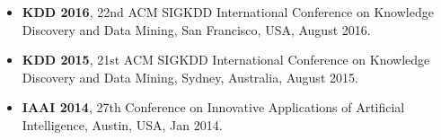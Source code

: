 

\begin{itemize}[nosep]
  \item {\bf KDD 2016}, 22nd ACM SIGKDD International Conference on 
    Knowledge Discovery and Data Mining, San Francisco, USA, August 2016.
  \item {\bf KDD 2015}, 21st ACM SIGKDD International Conference on 
    Knowledge Discovery and Data Mining, Sydney, Australia, August 2015.
  \item {\bf IAAI 2014}, 27th Conference on Innovative Applications of Artificial Intelligence,
    Austin, USA, Jan 2014.
\end{itemize}


